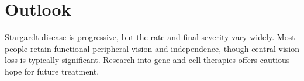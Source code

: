 \section{Outlook}
Stargardt disease is progressive, but the rate and final severity vary widely. Most people retain functional peripheral vision and independence, though central vision loss is typically significant. Research into gene and cell therapies offers cautious hope for future treatment.
